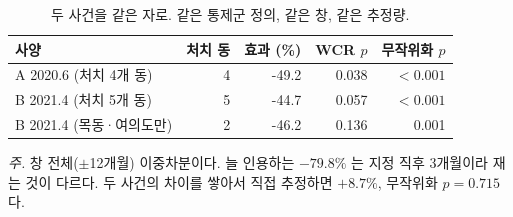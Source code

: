 \begin{table}[htbp]
  \centering
  \caption{두 사건을 같은 자로. 같은 통제군 정의, 같은 창, 같은 추정량.}
  \label{tab:bgroup}
  \begin{tabular}{lrrrr}
    \toprule
    \textbf{사양} & \textbf{처치 동} & \textbf{효과 (\%)} & \textbf{WCR $p$} & \textbf{무작위화 $p$} \\
    \midrule
    A 2020.6 (처치 4개 동) & 4 & -49.2 & 0.038 & $<0.001$ \\
    B 2021.4 (처치 5개 동) & 5 & -44.7 & 0.057 & $<0.001$ \\
    B 2021.4 (목동·여의도만) & 2 & -46.2 & 0.136 & 0.001 \\
    \bottomrule
  \end{tabular}

  \begin{minipage}{\linewidth}\footnotesize
  \textit{주.} 창 전체($\pm$12개월) 이중차분이다. 늘 인용하는 $-79.8\%$ 는 지정 직후 3개월이라 재는 것이 다르다. 두 사건의 차이를 쌓아서 직접 추정하면 $+8.7\%$, 무작위화 $p=0.715$ 다.
  \end{minipage}
\end{table}
